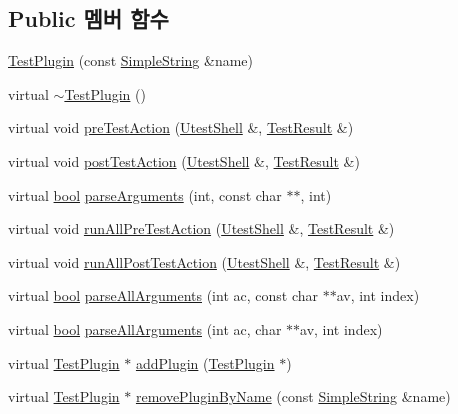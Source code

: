 \subsection*{Public 멤버 함수}
\begin{DoxyCompactItemize}
\item 
\hyperlink{class_test_plugin_a6d06d533df639e7769e55a2f6d090c01}{Test\+Plugin} (const \hyperlink{class_simple_string}{Simple\+String} \&name)
\item 
virtual \hyperlink{class_test_plugin_a81ef31ba1e637533d1dc8354944105c6}{$\sim$\+Test\+Plugin} ()
\item 
virtual void \hyperlink{class_test_plugin_aeb3d3b5a9cbcca6f8f4225bb29554ea2}{pre\+Test\+Action} (\hyperlink{class_utest_shell}{Utest\+Shell} \&, \hyperlink{class_test_result}{Test\+Result} \&)
\item 
virtual void \hyperlink{class_test_plugin_a4d9ea193c7b8e3eb8b50f985f688e4a8}{post\+Test\+Action} (\hyperlink{class_utest_shell}{Utest\+Shell} \&, \hyperlink{class_test_result}{Test\+Result} \&)
\item 
virtual \hyperlink{avb__gptp_8h_af6a258d8f3ee5206d682d799316314b1}{bool} \hyperlink{class_test_plugin_a167c2b07a0f83726bb9b1d1c0d741f88}{parse\+Arguments} (int, const char $\ast$$\ast$, int)
\item 
virtual void \hyperlink{class_test_plugin_aa3524b10b0f1613104fa75f1c1a72cf6}{run\+All\+Pre\+Test\+Action} (\hyperlink{class_utest_shell}{Utest\+Shell} \&, \hyperlink{class_test_result}{Test\+Result} \&)
\item 
virtual void \hyperlink{class_test_plugin_ac6e93f69beb5b43b8cedf17a77ccc6b1}{run\+All\+Post\+Test\+Action} (\hyperlink{class_utest_shell}{Utest\+Shell} \&, \hyperlink{class_test_result}{Test\+Result} \&)
\item 
virtual \hyperlink{avb__gptp_8h_af6a258d8f3ee5206d682d799316314b1}{bool} \hyperlink{class_test_plugin_acfa2bcea2c98a16cb7d2a8f177bb84b9}{parse\+All\+Arguments} (int ac, const char $\ast$$\ast$av, int index)
\item 
virtual \hyperlink{avb__gptp_8h_af6a258d8f3ee5206d682d799316314b1}{bool} \hyperlink{class_test_plugin_a6d3fb0408bb544bd7ec5ba9300328a5e}{parse\+All\+Arguments} (int ac, char $\ast$$\ast$av, int index)
\item 
virtual \hyperlink{class_test_plugin}{Test\+Plugin} $\ast$ \hyperlink{class_test_plugin_ac63612b566d31b52b9c09e0552f8fe9b}{add\+Plugin} (\hyperlink{class_test_plugin}{Test\+Plugin} $\ast$)
\item 
virtual \hyperlink{class_test_plugin}{Test\+Plugin} $\ast$ \hyperlink{class_test_plugin_a75abbb424eeb5b1466272ab22dd2cfcf}{remove\+Plugin\+By\+Name} (const \hyperlink{class_simple_string}{Simple\+String} \&name)
$$
\end{DoxyCompactItemize}
